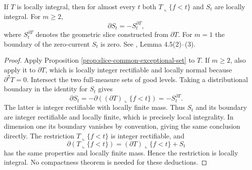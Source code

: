 \begin{proposition}\label{prop:integral-geometric-cut}
If $T$ is locally integral, then for almost every $t$ both $T\llcorner\{f<t\}$ and $S_t$ are locally integral. For $m\geq2$,
\[
 \partial S_t=-S_t^{\partial T},
\]
where $S_t^{\partial T}$ denotes the geometric slice constructed from $\partial T$. For $m=1$ the boundary of the zero-current $S_t$ is zero. See \cite{Sim18}, Lemma 4.5(2)--(3).
\end{proposition}
\begin{proof}
Apply Proposition \ref{prop:slice-common-exceptional-set} to $T$. If $m\geq2$, also apply it to $\partial T$, which is locally integer rectifiable and locally normal because $\partial^2T=0$. Intersect the two full-measure sets of good levels. Taking a distributional boundary in the identity for $S_t$ gives
\[
 \partial S_t=-\partial((\partial T)\llcorner\{f<t\})
             =-S_t^{\partial T}.
\]
The latter is integer rectifiable with locally finite mass. Thus $S_t$ and its boundary are integer rectifiable and locally finite, which is precisely local integrality. In dimension one its boundary vanishes by convention, giving the same conclusion directly. The restriction $T\llcorner\{f<t\}$ is integer rectifiable, and
\[
 \partial(T\llcorner\{f<t\})=(\partial T)\llcorner\{f<t\}+S_t
\]
has the same properties and locally finite mass. Hence the restriction is locally integral. No compactness theorem is needed for these deductions.
\end{proof}
